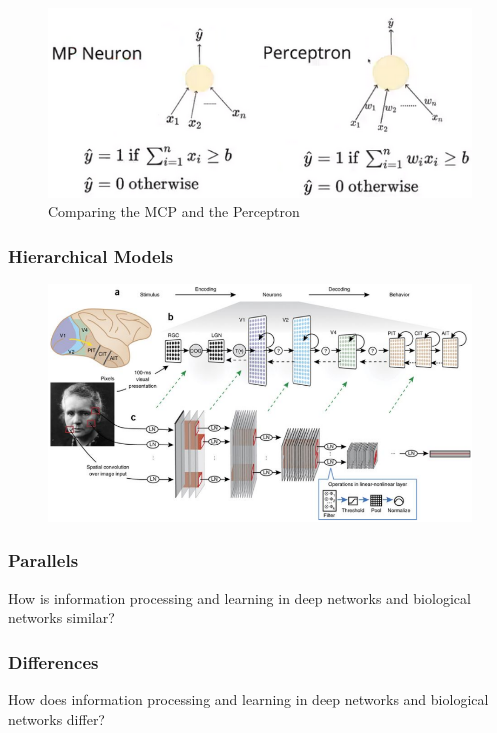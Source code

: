 \documentclass[main]{subfiles}
\begin{document}
\begin{figure}[H]
    \centering
    \includegraphics[width=0.8\linewidth]{01_Introduction/figures/MCP_Perceptron.png}
    \caption{Comparing the MCP and the Perceptron}
    \label{fig:basalandcerebellum}
\end{figure}

\subsubsection{Hierarchical Models}
\begin{figure}[H]
    \centering
    \includegraphics[width=0.99\linewidth]{01_Introduction/figures/hierarchical.png}
    \caption{}
    \label{fig:basalandcerebellum}
\end{figure}

\subsubsection{Parallels}
How is information processing and learning in deep networks and biological networks similar?

\subsubsection{Differences}
How does information processing and learning in deep networks and biological networks differ?
\end{document}
